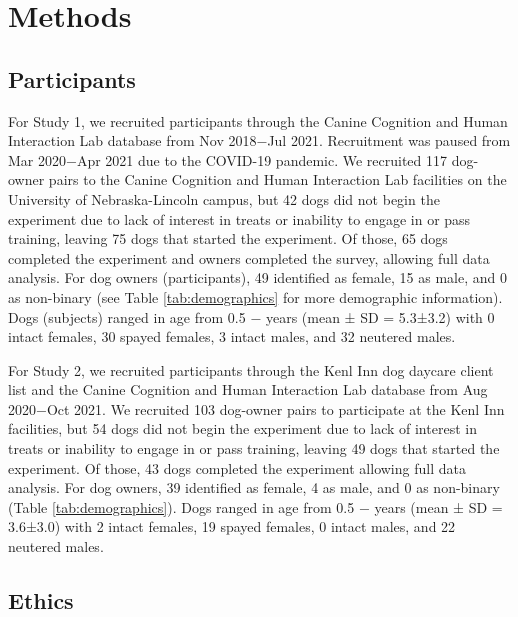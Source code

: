 \documentclass[
  pub,floatsintext]{apa6}
\begin{document}
\hypertarget{methods}{%
\section{Methods}\label{methods}}

\hypertarget{participants}{%
\subsection{Participants}\label{participants}}

For Study 1, we recruited participants through the Canine Cognition and Human Interaction Lab database from Nov 2018\(-\)Jul 2021. Recruitment was paused from Mar 2020\(-\)Apr 2021 due to the COVID-19 pandemic. We recruited 117 dog-owner pairs to the Canine Cognition and Human Interaction Lab facilities on the University of Nebraska-Lincoln campus, but 42 dogs did not begin the experiment due to lack of interest in treats or inability to engage in or pass training, leaving 75 dogs that started the experiment. Of those, 65 dogs completed the experiment and owners completed the survey, allowing full data analysis. For dog owners (participants), 49 identified as female, 15 as male, and 0 as non-binary (see Table \ref{tab:demographics} for more demographic information). Dogs (subjects) ranged in age from 0.5 \negthickspace \(-\)  years (mean ± SD = 5.3±3.2) with 0 intact females, 30 spayed females, 3 intact males, and 32 neutered males.

For Study 2, we recruited participants through the Kenl Inn dog daycare client list and the Canine Cognition and Human Interaction Lab database from Aug 2020\(-\)Oct 2021. We recruited 103 dog-owner pairs to participate at the Kenl Inn facilities, but 54 dogs did not begin the experiment due to lack of interest in treats or inability to engage in or pass training, leaving 49 dogs that started the experiment. Of those, 43 dogs completed the experiment allowing full data analysis. For dog owners, 39 identified as female, 4 as male, and 0 as non-binary (Table \ref{tab:demographics}). Dogs ranged in age from 0.5 \negthickspace \(-\)  years (mean ± SD = 3.6±3.0) with 2 intact females, 19 spayed females, 0 intact males, and 22 neutered males.

\hypertarget{ethics}{%
\subsection{Ethics}\label{ethics}}
\end{document}
